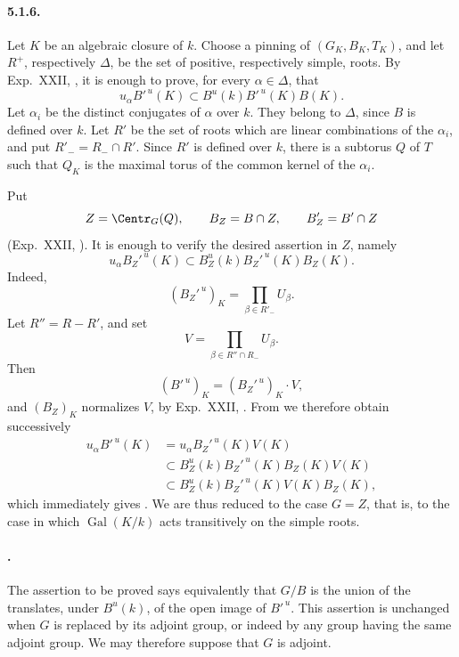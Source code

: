 \paragraph{5.1.6.}
Let \(K\) be an algebraic closure of \(k\).  Choose a pinning of
\((G_K,B_K,T_K)\), and let \(R^+\), respectively \(\Delta\), be the
set of positive, respectively simple, roots.  By Exp.\ XXII, ,
it is enough to prove, for every \(\alpha\in\Delta\), that
\[
 u_\alpha B'^{\,u}(K)
 \subset B^u(k)B'^{\,u}(K)B(K).                       \tag{1}\label{sga3:xxvi:theorem:5-1:equation:1}
\]
Let \(\alpha_i\) be the distinct conjugates of \(\alpha\) over \(k\).
They belong to \(\Delta\), since \(B\) is defined over \(k\).  Let
\(R'\) be the set of roots which are linear combinations of the
\(\alpha_i\), and put \(R'_- = R_-\cap R'\).  Since \(R'\) is defined
over \(k\), there is a subtorus \(Q\) of \(T\) such that \(Q_K\) is
the maximal torus of the common kernel of the \(\alpha_i\).

Put
\[
 Z=\Centr_G(Q),\qquad B_Z=B\cap Z,\qquad B'_Z=B'\cap Z
\]
\textup{(Exp.\ XXII, )}.  It is enough to verify the desired
assertion in \(Z\), namely
\[
 u_\alpha B_Z'^{\,u}(K)
 \subset B_Z^u(k)B_Z'^{\,u}(K)B_Z(K).                 \tag{2}\label{sga3:xxvi:theorem:5-1:equation:2}
\]
Indeed,
\[
 (B_Z'^{\,u})_K=\prod_{\beta\in R'_-}U_\beta.
\]
Let \(R''=R-R'\), and set
\[
 V=\prod_{\beta\in R''\cap R_-}U_\beta.
\]
Then
\[
 (B'^{\,u})_K=(B_Z'^{\,u})_K\cdot V,
\]
and \((B_Z)_K\) normalizes \(V\), by Exp.\ XXII, .  From
\textup{} we therefore obtain successively
\[
\begin{aligned}
 u_\alpha B'^{\,u}(K)
 &=u_\alpha B_Z'^{\,u}(K)V(K)\\
 &\subset B_Z^u(k)B_Z'^{\,u}(K)B_Z(K)V(K)\\
 &\subset B_Z^u(k)B_Z'^{\,u}(K)V(K)B_Z(K),
\end{aligned}
\]
which immediately gives \textup{}.  We are thus reduced to the case
\(G=Z\), that is, to the case in which
\(\operatorname{Gal}(K/k)\) acts transitively on the simple roots.

\paragraph{.}
The assertion to be proved says equivalently that \(G/B\) is the
union of the translates, under \(B^u(k)\), of the open image of
\(B'^{\,u}\).  This assertion is unchanged when \(G\) is replaced by
its adjoint group, or indeed by any group having the same adjoint
group.  We may therefore suppose that \(G\) is adjoint.

